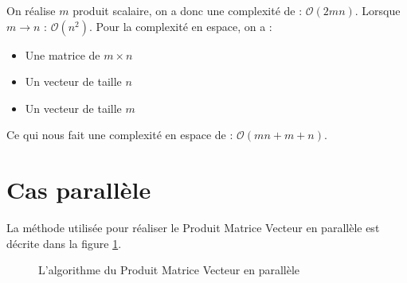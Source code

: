 \documentclass[a4paper]{article}
\begin{document}
On réalise $m$ produit scalaire, on a donc une complexité de : \textbf{$\mathcal{O}(2mn)$}. Lorsque $m \rightarrow n$ : \textbf{$\mathcal{O}(n^2)$}.
Pour la complexité en espace, on a :
\begin{itemize}
\item Une matrice de $m \times n$
\item Un vecteur de taille $n$
\item Un vecteur de taille $m$
\end{itemize}
Ce qui nous fait une complexité en espace de : \textbf{$\mathcal{O}(mn + m + n)$}.

\section{Cas parallèle}


La méthode utilisée pour réaliser le Produit Matrice Vecteur en parallèle est décrite dans la figure \ref{fig:algo_pmv_par}. \\

\begin{figure}[h]
	\caption{L'algorithme du Produit Matrice Vecteur en parallèle}%
	\label{fig:algo_pmv_par}%
\end{figure}
\end{document}

